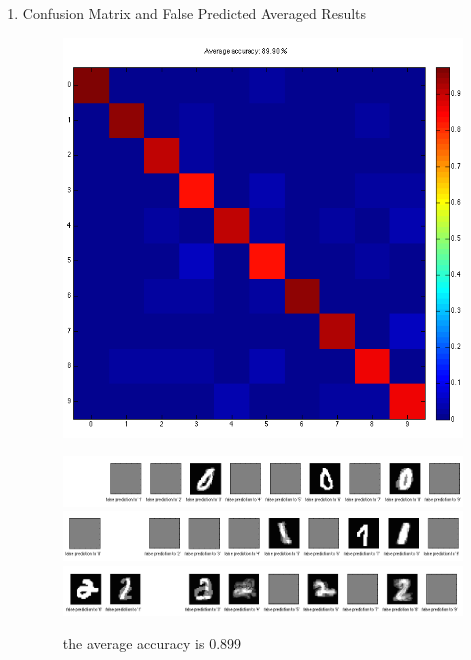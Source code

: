 \documentclass[12pt]{article}
\begin{document}
\begin{enumerate}
	\item Confusion Matrix and False Predicted Averaged Results
	\hspace{-2em}
	\begin{figure}[ht]
	\begin{minipage}[c][11cm][t]{.49\textwidth}
		\centering
		\includegraphics[scale=.5]{../res/confusion.png}
		\vspace{-2.3em}
		\caption{the average accuracy is 0.899}
	\end{minipage}
	\hspace{4em}
	\begin{minipage}[c][11cm][t]{.49\textwidth}
		\vspace{1.8em}
		\includegraphics[scale=.2]{../res/fp0.png}
		\includegraphics[scale=.2]{../res/fp1.png}
		\includegraphics[scale=.2]{../res/fp2.png}

\end{minipage}
\end{figure}
\end{enumerate}
\end{document}
